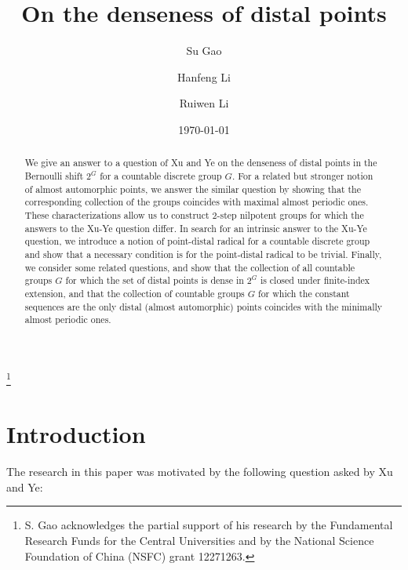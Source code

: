 \documentclass[11pt]{amsart}
\theoremstyle{definition}
\numberwithin{equation}{section}
\theoremstyle{definition}
\begin{document}
\title{On the denseness of distal points}
\author{Su Gao}
\address{School of Mathematical Sciences and LPMC\\ Nankai University \\ Tianjin 300071 \\P.R. China}
\thanks{S. Gao acknowledges the partial support of his research by the Fundamental Research Funds for the Central Universities and by the National Science Foundation of China (NSFC) grant 12271263.}
\author{Hanfeng Li}
\address{College of Mathematics and Statistics, Center of Mathematics, Chongqing University, Chongqing 401331, P.R. China}
\author{Ruiwen Li}
\address{School of Mathematical Sciences and LPMC\\ Nankai University \\ Tianjin 300071 \\P.R. China}
\date{\today}
\begin{abstract} We give an answer to a question of Xu and Ye \cite{XY} on the denseness of distal points in the Bernoulli shift $2^G$ for a countable discrete group $G$. For a related but stronger notion of almost automorphic points, we answer the similar question by showing that the corresponding collection of the groups coincides with maximal almost periodic ones. These characterizations allow us to construct $2$-step nilpotent groups for which the answers to the Xu-Ye question differ. In search for an intrinsic answer to the Xu-Ye question, we introduce a notion of point-distal radical for a countable discrete group and show that a necessary condition is for the point-distal radical to be trivial. Finally, we consider some related questions, and show that the collection of all countable groups $G$ for which the set of distal points is dense in $2^G$ is closed under finite-index extension, and that the collection of countable groups $G$ for which the constant sequences are the only distal (almost automorphic) points coincides with the minimally almost periodic ones.
\end{abstract}
\maketitle

\section{Introduction}
The research in this paper was motivated by the following question asked by Xu and Ye:
\end{document}
